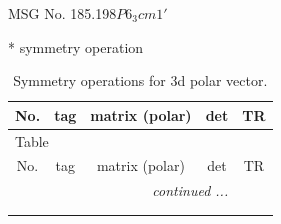 \documentclass[fleqn,8pt]{jsarticle}
\begin{document}
\setcounter{MaxMatrixCols}{32}

\renewcommand{\tablename}{Table~}
\renewcommand{\figurename}{Figure~}
\begin{center}
\LARGE
MSG No. 185.198\quad$P6_{3}cm1'$
\end{center}
* symmetry operation
\renewcommand{\arraystretch}{1.3}
\begin{longtable}{ccccc}
\caption{Symmetry operations for 3d polar vector.}
 \\
 \hline \hline
No. & tag & matrix (polar) & det & TR \\ \hline \endfirsthead

\multicolumn{4}{l}{\tablename\ \thetable{}} \\
 \hline \hline
No. & tag & matrix (polar) & det & TR \\ \hline \endhead

 \hline \hline
\multicolumn{4}{r}{\footnotesize\it continued ...} \\ \endfoot

 \hline \hline
\multicolumn{4}{r}{} \\ \endlastfoot


\end{longtable}
\end{document}

